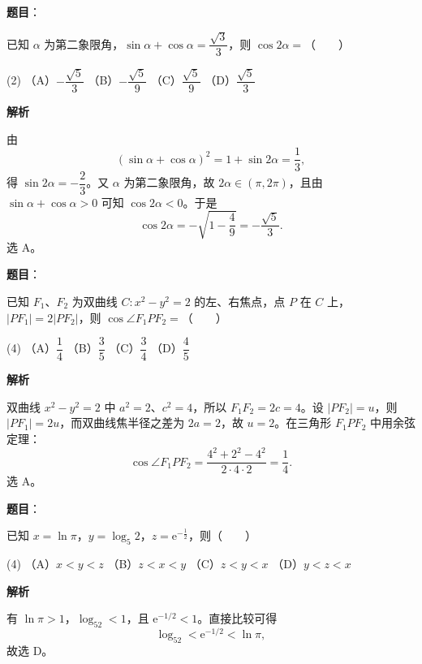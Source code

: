 \begin{answer}

\textbf{题目}：

已知 $\alpha$ 为第二象限角，$\sin\alpha+\cos\alpha=\dfrac{\sqrt3}{3}$，则 $\cos2\alpha=$\mbox{（　　）}

\begin{gkopts}(2)
\task （A）$-\dfrac{\sqrt5}{3}$
\task （B）$-\dfrac{\sqrt5}{9}$
\task （C）$\dfrac{\sqrt5}{9}$
\task （D）$\dfrac{\sqrt5}{3}$
\end{gkopts}

\textbf{解析}

由
\nopagebreak[4]
\[
\left(\sin\alpha+\cos\alpha\right)^2=1+\sin2\alpha=\frac13,
\]
得 $\sin2\alpha=-\dfrac23$。又 $\alpha$ 为第二象限角，故 $2\alpha\in(\pi,2\pi)$，且由 $\sin\alpha+\cos\alpha>0$ 可知 $\cos2\alpha<0$。于是
\nopagebreak[4]
\[
\cos2\alpha=-\sqrt{1-\frac49}=-\frac{\sqrt5}{3}.
\]
选 A。


\end{answer}
\begin{answer}

\textbf{题目}：

已知 $F_1\text{、}F_2$ 为双曲线 $C:x^2-y^2=2$ 的左、右焦点，点 $P$ 在 $C$ 上，$|PF_1|=2|PF_2|$，则 $\cos\angle F_1PF_2=$\mbox{（　　）}

\begin{gkopts}(4)
\task （A）$\dfrac14$
\task （B）$\dfrac35$
\task （C）$\dfrac34$
\task （D）$\dfrac45$
\end{gkopts}

\textbf{解析}

双曲线 $x^2-y^2=2$ 中 $a^2=2$、$c^2=4$，所以 $F_1F_2=2c=4$。设 $|PF_2|=u$，则 $|PF_1|=2u$，而双曲线焦半径之差为 $2a=2$，故 $u=2$。在三角形 $F_1PF_2$ 中用余弦定理：
\nopagebreak[4]
\[
\cos\angle F_1PF_2=\frac{4^2+2^2-4^2}{2\cdot4\cdot2}=\frac14.
\]
选 A。


\end{answer}
\begin{answer}

\textbf{题目}：

已知 $x=\ln\pi$，$y=\log_5 2$，$z=\mathrm e^{-\frac12}$，则\mbox{（　　）}

\begin{gkopts}(4)
\task （A）$x<y<z$
\task （B）$z<x<y$
\task （C）$z<y<x$
\task （D）$y<z<x$
\end{gkopts}

\textbf{解析}

有 $\ln\pi>1$，$\log_52<1$，且 $\mathrm e^{-1/2}<1$。直接比较可得
\nopagebreak[4]
\[
\log_52<\mathrm e^{-1/2}<\ln\pi,
\]
故选 D。


\end{answer}
